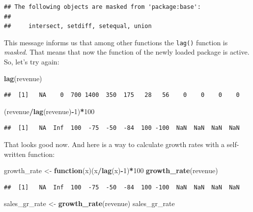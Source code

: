 \documentclass[
  12pt,
  oneside]{book}
\newenvironment{Shaded}{\begin{snugshade}}{\end{snugshade}}
\newcommand{\ControlFlowTok}[1]{\textcolor[rgb]{0.13,0.29,0.53}{\textbf{#1}}}
\newcommand{\DecValTok}[1]{\textcolor[rgb]{0.00,0.00,0.81}{#1}}
\newcommand{\FunctionTok}[1]{\textcolor[rgb]{0.13,0.29,0.53}{\textbf{#1}}}
\newcommand{\NormalTok}[1]{#1}
\newcommand{\OtherTok}[1]{\textcolor[rgb]{0.56,0.35,0.01}{#1}}
\newcommand{\SpecialCharTok}[1]{\textcolor[rgb]{0.81,0.36,0.00}{\textbf{#1}}}
\begin{document}
\begin{verbatim}
## The following objects are masked from 'package:base':
## 
##     intersect, setdiff, setequal, union
\end{verbatim}

This message informs us that among other functions the \texttt{lag()} function is \emph{masked}. That means that now the function of the newly loaded package is active. So, let's try again:

\begin{Shaded}
\begin{Highlighting}[]
\FunctionTok{lag}\NormalTok{(revenue)}
\end{Highlighting}
\end{Shaded}

\begin{verbatim}
##  [1]   NA    0  700 1400  350  175   28   56    0    0    0    0
\end{verbatim}

\begin{Shaded}
\begin{Highlighting}[]
\NormalTok{(revenue}\SpecialCharTok{/}\FunctionTok{lag}\NormalTok{(revenue)}\SpecialCharTok{{-}}\DecValTok{1}\NormalTok{)}\SpecialCharTok{*}\DecValTok{100} 
\end{Highlighting}
\end{Shaded}

\begin{verbatim}
##  [1]   NA  Inf  100  -75  -50  -84  100 -100  NaN  NaN  NaN  NaN
\end{verbatim}

That looks good now. And here is a way to calculate growth rates with a self-written function:

\begin{Shaded}
\begin{Highlighting}[]
\NormalTok{growth\_rate }\OtherTok{\textless{}{-}} \ControlFlowTok{function}\NormalTok{(x)(x}\SpecialCharTok{/}\FunctionTok{lag}\NormalTok{(x)}\SpecialCharTok{{-}}\DecValTok{1}\NormalTok{)}\SpecialCharTok{*}\DecValTok{100} 
\FunctionTok{growth\_rate}\NormalTok{(revenue)}
\end{Highlighting}
\end{Shaded}

\begin{verbatim}
##  [1]   NA  Inf  100  -75  -50  -84  100 -100  NaN  NaN  NaN  NaN
\end{verbatim}

\begin{Shaded}
\begin{Highlighting}[]
\NormalTok{sales\_gr\_rate }\OtherTok{\textless{}{-}} \FunctionTok{growth\_rate}\NormalTok{(revenue)}
\NormalTok{sales\_gr\_rate}
\end{Highlighting}
\end{Shaded}
\end{document}
